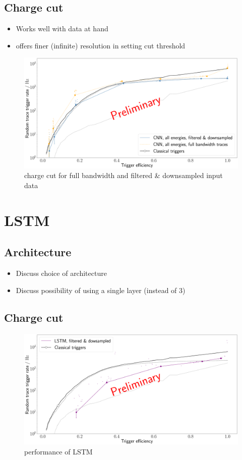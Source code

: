\subsection{Charge cut}
\label{ssec:cnn-charge-cut}

\begin{itemize}
	\item Works well with data at hand
	\item offers finer (infinite) resolution in setting cut threshold
\end{itemize}

\begin{figure}
	\centering
	\includegraphics[width=1\textwidth]{./plots/prelim/charge_cut.png}
	\caption{charge cut for full bandwidth and filtered \& downsampled input data}
\end{figure}

\section{LSTM}
\label{sec:lstm-performance}

\subsection{Architecture}
\label{ssec:lstm-architecture}

\begin{itemize}
	\item Discuss choice of architecture
	\item Discuss possibility of using a single layer (instead of 3)
\end{itemize}

\subsection{Charge cut}
\label{ssec:cnn-charge-cut}

\begin{figure}
	\centering
	\includegraphics[width=1\textwidth]{./plots/prelim/LSTM.png}
	\caption{performance of LSTM}
\end{figure}
